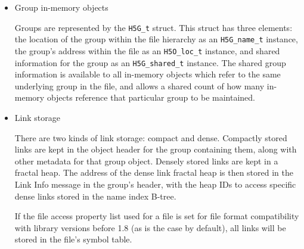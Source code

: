\begin{itemize}

    \item Group in-memory objects

Groups are represented by the \texttt{H5G\_t} struct. This struct has three elements: the location of the group within the file hierarchy as an \texttt{H5G\_name\_t} instance, the group's address within the file as an \texttt{H5O\_loc\_t} instance, and shared information for the group as an \texttt{H5G\_shared\_t} instance. The shared group information is available to all in-memory objects which refer to the same underlying group in the file, and allows a shared count of how many in-memory objects reference that particular group to be maintained. %

    \item Link storage

There are two kinds of link storage: compact and dense. Compactly stored links are kept in the object header for the group containing them, along with other metadata for that group object. Densely stored links are kept in a fractal heap. The address of the dense link fractal heap is then stored in the Link Info message in the group's header, with the heap IDs to access specific dense links stored in the name index B-tree. 

If the file access property list used for a file is set for file format compatibility with library versions before 1.8 (as is the case by default), all links will be stored in the file's symbol table.




\end{itemize}
